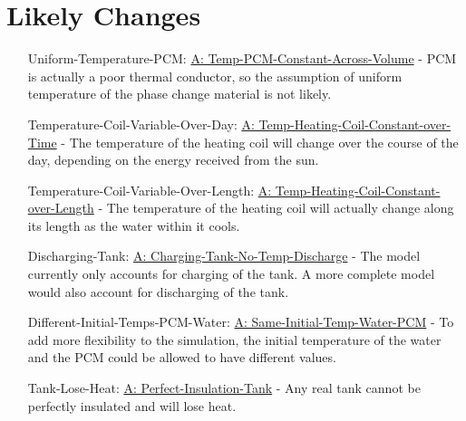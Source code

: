 \documentclass[12pt]{article}
\begin{document}
\section{Likely Changes}
\label{Sec:LCs}
\begin{itemize}
\item[Uniform-Temperature-PCM:\phantomsection\label{likeChgUTP}]\hyperref[A:Temp-PCM-Constant-Across-Volume]{A: Temp-PCM-Constant-Across-Volume} - PCM is actually a poor thermal conductor, so the assumption of uniform temperature of the phase change material is not likely.
\item[Temperature-Coil-Variable-Over-Day:\phantomsection\label{likeChgTCVOD}]\hyperref[A:Temp-Heating-Coil-Constant-over-Time]{A: Temp-Heating-Coil-Constant-over-Time} - The temperature of the heating coil will change over the course of the day, depending on the energy received from the sun.
\item[Temperature-Coil-Variable-Over-Length:\phantomsection\label{likeChgTCVOL}]\hyperref[A:Temp-Heating-Coil-Constant-over-Length]{A: Temp-Heating-Coil-Constant-over-Length} - The temperature of the heating coil will actually change along its length as the water within it cools.
\item[Discharging-Tank:\phantomsection\label{likeChgDT}]\hyperref[A:Charging-Tank-No-Temp-Discharge]{A: Charging-Tank-No-Temp-Discharge} - The model currently only accounts for charging of the tank. A more complete model would also account for discharging of the tank.
\item[Different-Initial-Temps-PCM-Water:\phantomsection\label{likeChgDITPW}]\hyperref[A:Same-Initial-Temp-Water-PCM]{A: Same-Initial-Temp-Water-PCM} - To add more flexibility to the simulation, the initial temperature of the water and the PCM could be allowed to have different values.
\item[Tank-Lose-Heat:\phantomsection\label{likeChgTLH}]\hyperref[A:Perfect-Insulation-Tank]{A: Perfect-Insulation-Tank} - Any real tank cannot be perfectly insulated and will lose heat.
\end{itemize}
\end{document}
